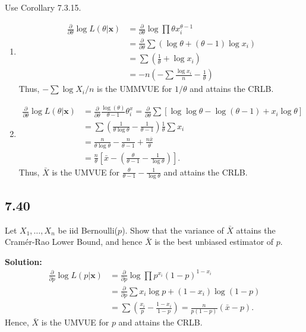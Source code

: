 \documentclass[11pt]{article}
\newcommand{\x}{\mathbf{x}}
\newcommand{\Sol}{\par {\bf Solution:}}
\newcommand{\sample}[1]{#1_1 , \dots , #1_n}
\newcommand{\Partial}[1]{\frac{\partial}{\partial #1}}
\begin{document}
Use Corollary 7.3.15.
\begin{enumerate}[label=(\alph*)]
    
    \item
    \begin{align*}
    \frac{\partial}{\partial \theta}\log L(\theta|\x) &= \frac{\partial}{\partial \theta}\log \prod \theta x_i^{\theta -1} \\
    &= \frac{\partial}{\partial \theta} \sum (\log \theta + (\theta - 1)\log x_i) \\
    & = \sum (\frac{1}{\theta} + \log x_i) \\
    &= -n(-\sum \frac{\log x_i}{n} - \frac{1}{\theta})
    \end{align*}
    Thus, $- \sum \log X_i/n$ is the UMMVUE for $1/\theta$ and attains the CRLB.
    \item
    \begin{align*}
        \Partial{\theta} \log L(\theta|\x) &= \Partial{\theta} \frac{\log (\theta)}{\theta - 1}\theta^x_i = \Partial{\theta}\sum [\log \log \theta - \log(\theta - 1) + x_i\log \theta] \\
        &= \sum (\frac{1}{\theta\log \theta} - \frac{1}{\theta -1}) \frac{1}{\theta}\sum x_i \\
        &= \frac{n}{\theta \log \theta} - \frac{n}{\theta -1} + \frac{n\bar x}{\theta} \\
        &=\frac{n}{\theta}[\bar x - (\frac{\theta}{\theta - 1}- \frac{1}{\log \theta})].
    \end{align*}
    Thus, $\bar X$ is the UMVUE for $\frac{\theta}{\theta - 1}- \frac{1}{\log \theta}$ and attains the CRLB.
\end{enumerate}

\subsection*{7.40}
Let $\sample{X}$ be iid Bernoulli($p$). Show that the variance of $\bar X$ attains the Cram\'{e}r-Rao Lower Bound, and hence $\bar X$ is the best unbiased estimator of $p$.
\Sol
\begin{align*}
    \Partial{p} \log L(p|\x) &= \Partial{p} \log \prod p^{x_i}(1-p)^{1 - x_i} \\
    &= \Partial{p} \sum x_i \log p + (1-x_i)\log(1-p) \\
    &=\sum (\frac{x_i}{p} - \frac{1-x_i}{1-p}) = \frac{n}{p(1-p)}(\bar x - p).
\end{align*}
Hence, $\bar X$ is the UMVUE for $p$ and attains the CRLB.
\end{document}
